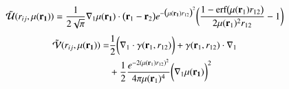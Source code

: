 \documentclass[aip,jcp,reprint,noshowkeys,superscriptaddress]{revtex4-1}
\newcommand{\br}[0]{{\bf {r}}}
\newcommand{\bri}[1]{{\bf r}_{#1}}
\newcommand{\mur}[1]{\mu({\bf r_{#1}})}
\begin{document}
\begin{equation}
 \begin{aligned}                                                                                                                             
 \tilde{\mathcal{U}}(r_{ij},\mur{1}) = \frac{1}{2\sqrt{\pi}}\nabla_1 \mur{1} \cdot \big(\br_1 - \br_2 \big) 
  e^{-\big( \mur{1} r_{12}\big)^2}\bigg(\frac{1 - \text{erf}\big(\mu(\bri{1}) r_{12} \big)}{2 \mu(\bri{1})^2 r_{12}} -1\bigg)
 \end{aligned}
\end{equation}
\begin{equation}
 \begin{aligned}                                                                                                                             
 \tilde{\mathcal{V}}(r_{ij},\mur{1}) = & \frac{1}{2}\bigg( \nabla_1 \cdot \gamma(\br_1, r_{12}) \bigg) + \gamma(\br_1, r_{12}) \cdot \nabla_1 
\\ 
&+ \frac{1}{2}\frac{e^{-2(\mu(\bri{1}) r_{12})^2}}{4 \pi \mu(\bri{1})^4} \bigg( \nabla_1  \mur{1}\bigg)^2
 \end{aligned}
\end{equation}



\end{document}
